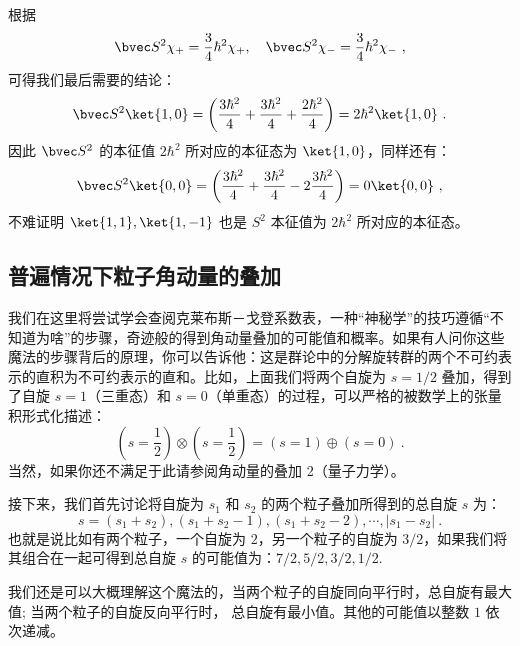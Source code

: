 根据
\begin{equation}
\bvec S^2\chi_+=\frac{3}{4}\hbar^2\chi_+,\quad \bvec S^2\chi_-=\frac{3}{4}\hbar^2\chi_-~,
\end{equation}
可得我们最后需要的结论：
\begin{equation}
\bvec S^2\ket{1,0}=\left(\frac{3\hbar^2}{4}+\frac{3\hbar^2}{4}+\frac{2\hbar^2}{4}\right)=2\hbar^2\ket{1,0}~.
\end{equation}
因此 $\bvec S^2$ 的本征值 $2\hbar^2$ 所对应的本征态为 $\ket{1,0}$，同样还有：
\begin{equation}
\bvec S^2\ket{0,0}=\left(\frac{3\hbar^2}{4}+\frac{3\hbar^2}{4}-2\frac{3\hbar^2}{4}\right)=0\ket{0,0}~,
\end{equation}
不难证明 $\ket{1,1},\ket{1,-1}$ 也是 $S^2$ 本征值为 $2\hbar^2$ 所对应的本征态。
\subsection{普遍情况下粒子角动量的叠加}
我们在这里将尝试学会查阅克莱布斯－戈登系数表，一种“神秘学”的技巧遵循“不知道为啥”的步骤，奇迹般的得到角动量叠加的可能值和概率。如果有人问你这些魔法的步骤背后的原理，你可以告诉他：这是群论中的分解旋转群的两个不可约表示的直积为不可约表示的直和。比如，上面我们将两个自旋为 $s=1/2$ 叠加，得到了自旋 $s=1$（三重态）和 $s=0$（单重态）的过程，可以严格的被数学上的张量积形式化描述：
\begin{equation}
(s=\frac{1}{2})\otimes(s=\frac{1}{2})=(s=1)\oplus (s=0)~.
\end{equation}
当然，如果你还不满足于此请参阅角动量的叠加 2（量子力学）。

接下来，我们首先讨论将自旋为 $s_1$ 和 $s_2$ 的两个粒子叠加所得到的总自旋 $s$ 为：
\begin{equation}
s=(s_1+s_2),(s_1+s_2-1),(s_1+s_2-2),\cdots,|s_1-s_2|~.
\end{equation}
也就是说比如有两个粒子，一个自旋为 $2$，另一个粒子的自旋为 $3/2$，如果我们将其组合在一起可得到总自旋 $s$ 的可能值为：$7/2,5/2,3/2,1/2$.

我们还是可以大概理解这个魔法的，当两个粒子的自旋同向平行时，总自旋有最大值; 当两个粒子的自旋反向平行时， 总自旋有最小值。其他的可能值以整数 $1$ 依次递减。

